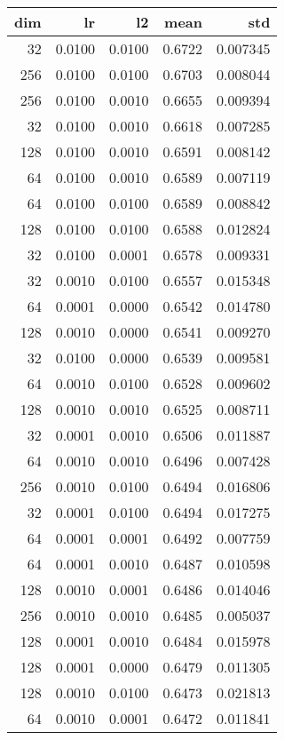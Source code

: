 \begin{tabular}{rrrrr}
\toprule
 dim &      lr &      l2 &    mean &       std \\
\midrule
  32 &  0.0100 &  0.0100 &  0.6722 &  0.007345 \\
 256 &  0.0100 &  0.0100 &  0.6703 &  0.008044 \\
 256 &  0.0100 &  0.0010 &  0.6655 &  0.009394 \\
  32 &  0.0100 &  0.0010 &  0.6618 &  0.007285 \\
 128 &  0.0100 &  0.0010 &  0.6591 &  0.008142 \\
  64 &  0.0100 &  0.0010 &  0.6589 &  0.007119 \\
  64 &  0.0100 &  0.0100 &  0.6589 &  0.008842 \\
 128 &  0.0100 &  0.0100 &  0.6588 &  0.012824 \\
  32 &  0.0100 &  0.0001 &  0.6578 &  0.009331 \\
  32 &  0.0010 &  0.0100 &  0.6557 &  0.015348 \\
  64 &  0.0001 &  0.0000 &  0.6542 &  0.014780 \\
 128 &  0.0010 &  0.0000 &  0.6541 &  0.009270 \\
  32 &  0.0100 &  0.0000 &  0.6539 &  0.009581 \\
  64 &  0.0010 &  0.0100 &  0.6528 &  0.009602 \\
 128 &  0.0010 &  0.0010 &  0.6525 &  0.008711 \\
  32 &  0.0001 &  0.0010 &  0.6506 &  0.011887 \\
  64 &  0.0010 &  0.0010 &  0.6496 &  0.007428 \\
 256 &  0.0010 &  0.0100 &  0.6494 &  0.016806 \\
  32 &  0.0001 &  0.0100 &  0.6494 &  0.017275 \\
  64 &  0.0001 &  0.0001 &  0.6492 &  0.007759 \\
  64 &  0.0001 &  0.0010 &  0.6487 &  0.010598 \\
 128 &  0.0010 &  0.0001 &  0.6486 &  0.014046 \\
 256 &  0.0010 &  0.0010 &  0.6485 &  0.005037 \\
 128 &  0.0001 &  0.0010 &  0.6484 &  0.015978 \\
 128 &  0.0001 &  0.0000 &  0.6479 &  0.011305 \\
 128 &  0.0010 &  0.0100 &  0.6473 &  0.021813 \\
  64 &  0.0010 &  0.0001 &  0.6472 &  0.011841 \\

\end{tabular}
